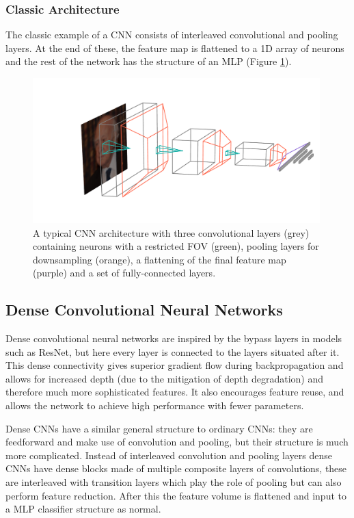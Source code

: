 \subsubsection{Classic Architecture}
The classic example of a CNN \cite{CS231n} consists of interleaved convolutional and pooling layers. At the end of these, the feature map is flattened to a 1D array of neurons and the rest of the network has the structure of an MLP (Figure \ref{fig:machine_learning:classic_CNN}). 
\begin{figure}[h!]
    \centering
    \includegraphics[width=0.99\textwidth]{figures/machine_learning/convnet_arch.pdf}
    \caption{A typical CNN architecture with three convolutional layers (grey) containing neurons with a restricted FOV (green), pooling layers for downsampling (orange), a flattening of the final feature map (purple) and a set of fully-connected layers.}
        \label{fig:machine_learning:classic_CNN}
\end{figure}


\subsection{Dense Convolutional Neural Networks}
Dense convolutional neural networks \cite{DenseNet} are inspired by the bypass layers in models such as  ResNet, but here every layer is connected to the layers situated after it. 
This dense connectivity gives superior gradient flow during backpropagation and allows for increased depth (due to the mitigation of depth degradation) and therefore much more sophisticated features. It also encourages feature reuse, and allows the network to achieve high performance with fewer parameters. 

Dense CNNs have a similar general structure to ordinary CNNs: they are feedforward and make use of convolution and pooling, but their structure is much more complicated. 
Instead of interleaved convolution and pooling layers dense CNNs have dense blocks made of multiple composite layers of convolutions, these are interleaved with transition layers which play the role of pooling but can also perform feature reduction. After this the feature volume is flattened and input to a MLP classifier structure as normal. 

